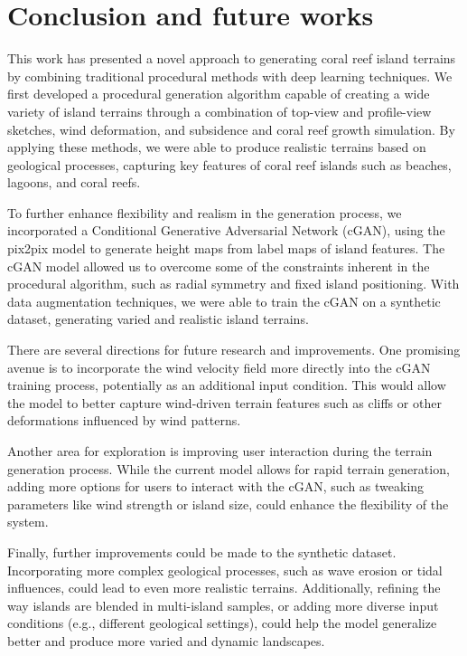 \section{Conclusion and future works}
\label{sec:coral-island_conclusion}

This work has presented a novel approach to generating coral reef island terrains by combining traditional procedural methods with deep learning techniques. We first developed a procedural generation algorithm capable of creating a wide variety of island terrains through a combination of top-view and profile-view sketches, wind deformation, and subsidence and coral reef growth simulation. By applying these methods, we were able to produce realistic terrains based on geological processes, capturing key features of coral reef islands such as beaches, lagoons, and coral reefs.

To further enhance flexibility and realism in the generation process, we incorporated a Conditional Generative Adversarial Network (cGAN), using the pix2pix model to generate height maps from label maps of island features. The cGAN model allowed us to overcome some of the constraints inherent in the procedural algorithm, such as radial symmetry and fixed island positioning. With data augmentation techniques, we were able to train the cGAN on a synthetic dataset, generating varied and realistic island terrains.



There are several directions for future research and improvements. One promising avenue is to incorporate the wind velocity field more directly into the cGAN training process, potentially as an additional input condition. This would allow the model to better capture wind-driven terrain features such as cliffs or other deformations influenced by wind patterns.

Another area for exploration is improving user interaction during the terrain generation process. While the current model allows for rapid terrain generation, adding more options for users to interact with the cGAN, such as tweaking parameters like wind strength or island size, could enhance the flexibility of the system.

Finally, further improvements could be made to the synthetic dataset. Incorporating more complex geological processes, such as wave erosion or tidal influences, could lead to even more realistic terrains. Additionally, refining the way islands are blended in multi-island samples, or adding more diverse input conditions (e.g., different geological settings), could help the model generalize better and produce more varied and dynamic landscapes.


